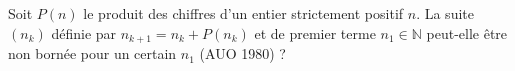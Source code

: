 Soit $P(n)$ le produit des chiffres d'un entier strictement positif $n$. La suite $(n_k)$ définie par $n_{k+1} = n_k + P(n_k)$ et de premier terme $n_1 \in \mathbb{N}$ peut-elle être non bornée pour un certain $n_1$ (AUO 1980) ?
